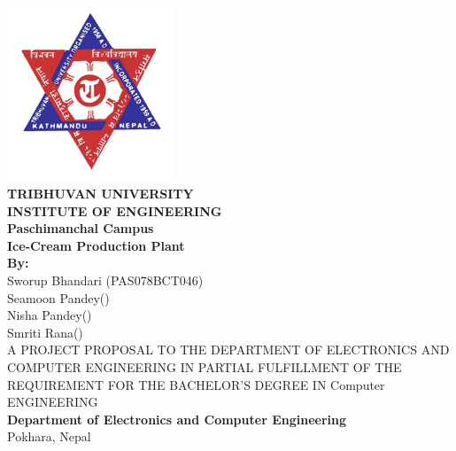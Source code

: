 \newenvironment{coverpage}
\thispagestyle{empty}
\begin{titlepage}
 
  \noindent%
  
  \begin{center}
  	\includegraphics[width=50mm]{figures/tu.jpg}\\
  
\textsc{\LARGE \bfseries TRIBHUVAN UNIVERSITY}\\[0.5cm] %
\textsc{\large \bfseries INSTITUTE OF ENGINEERING}\\
\large \textbf{ Paschimanchal Campus } \\[0.5cm]
\vspace{0.5cm}
\Large \textbf{Ice-Cream Production Plant}\\[0.5cm]
\vspace{0.5cm}
\textbf{By:}\\
\large{ Sworup Bhandari   (PAS078BCT046) \\
Seamoon Pandey()\\
Nisha Pandey()\\
Smriti Rana()}\\
\vspace{1.2cm}
A PROJECT PROPOSAL TO THE DEPARTMENT OF ELECTRONICS AND COMPUTER
	ENGINEERING IN PARTIAL FULFILLMENT OF THE REQUIREMENT FOR THE BACHELOR'S
	DEGREE IN Computer ENGINEERING \\[1.2cm]


\textbf{Department of Electronics and Computer Engineering}\\
Pokhara, Nepal
\\[0.4cm]
\vspace{0.5cm}

\end{center}
\end{titlepage}
